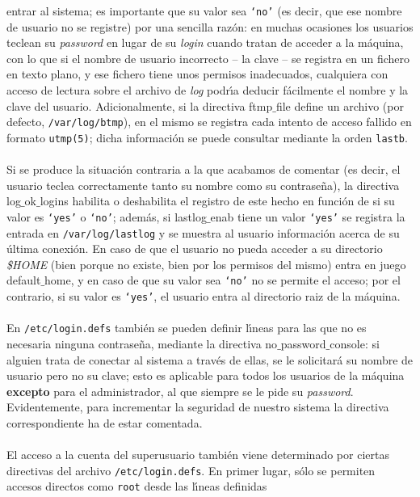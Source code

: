 entrar al sistema; es importante que su valor sea {\tt `no'} (es decir, que 
ese nombre de usuario no se registre) por una sencilla raz\'on: en muchas
ocasiones los usuarios teclean su {\it password} en lugar de su {\it login} 
cuando tratan de acceder a la m\'aquina, con lo que si el nombre de usuario
incorrecto -- la clave -- se registra en un fichero en texto plano, y ese 
fichero tiene unos permisos inadecuados, cualquiera con acceso de lectura sobre
el archivo de {\it log} podr\'{\i}a deducir f\'acilmente el nombre y la clave 
del usuario. Adicionalmente, si la directiva {\sc ftmp$\_$file} define un
archivo (por defecto, {\tt /var/log/btmp}), en el mismo se registra cada 
intento de acceso fallido en formato {\tt utmp(5)}; dicha informaci\'on se 
puede consultar mediante la orden {\tt lastb}.\\
\\Si se produce la situaci\'on contraria a la que acabamos de comentar (es
decir, el usuario teclea correctamente tanto su nombre como su contrase\~na),
la directiva {\sc log$\_$ok$\_$logins} habilita o deshabilita el registro de 
este hecho en funci\'on de si su valor es {\tt `yes'} o {\tt `no'}; adem\'as,
si {\sc lastlog$\_$enab} tiene un valor {\tt `yes'} se registra la entrada en
{\tt /var/log/lastlog} y se muestra al usuario informaci\'on acerca de su 
\'ultima conexi\'on. En caso de que el usuario no pueda acceder a su directorio 
{\it \$HOME} (bien porque no existe, bien por los permisos del mismo) entra en
juego {\sc default$\_$home}, y en caso de que su valor sea {\tt `no'} no se
permite el acceso; por el contrario, si su valor es {\tt `yes'}, el usuario 
entra al directorio raiz de la m\'aquina.\\
\\En {\tt /etc/login.defs} tambi\'en se pueden definir l\'{\i}neas para las que
no es necesaria ninguna contrase\~na, mediante la directiva {\sc 
no$\_$password$\_$console}: si alguien trata de conectar al sistema
a trav\'es de ellas, se le solicitar\'a su nombre de usuario pero no su clave;
esto es aplicable para todos los usuarios de la m\'aquina {\bf excepto} para
el administrador, al que siempre se le pide su {\it password}. Evidentemente,
para incrementar la seguridad de nuestro sistema la directiva correspondiente 
ha de estar comentada.\\
\\El acceso a la cuenta del superusuario tambi\'en viene determinado por 
ciertas directivas del archivo {\tt /etc/login.defs}. En primer lugar, s\'olo
se permiten accesos directos como {\tt root} desde las l\'{\i}neas definidas

